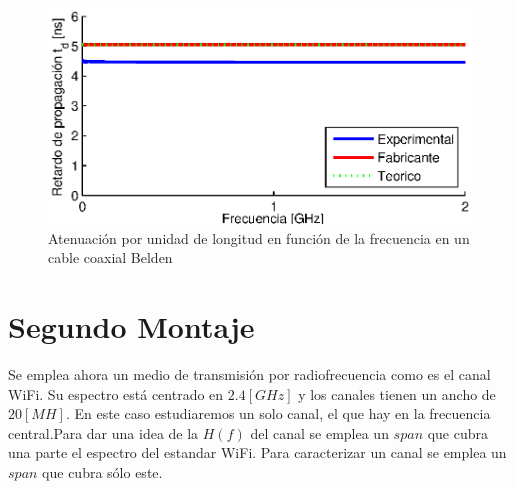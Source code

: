 \documentclass[10pt,conference,a4paper]{IEEEtran}
\begin{document}
\begin{figure}[htb]
    \centering
    \includegraphics[width=\columnwidth]{figuras/retardo.eps}
    \caption{Atenuación por unidad de longitud en función de la frecuencia en un cable coaxial Belden}
    \label{fig:retardo_coaxial}
\end{figure}

\section{Segundo Montaje}

Se emplea ahora un medio de transmisión por radiofrecuencia como es el canal WiFi. Su espectro está centrado en $2.4[GHz]$ y los canales tienen un ancho de $20[MH]$. En este caso estudiaremos un solo canal, el que hay en la frecuencia central.Para dar una idea de la $H(f)$ del canal se emplea un $span$ que cubra una parte  el espectro del estandar WiFi. Para caracterizar un canal se emplea un $span$ que cubra sólo este.
\end{document}
